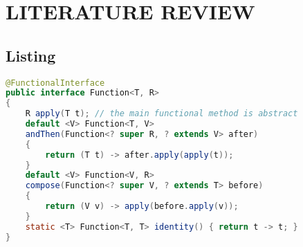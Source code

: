 
\chapter{LITERATURE REVIEW}

\section{Listing}

\begin{lstlisting}[language=Java]
@FunctionalInterface
public interface Function<T, R>
{
	R apply(T t); // the main functional method is abstract
	default <V> Function<T, V>
	andThen(Function<? super R, ? extends V> after)
	{
		return (T t) -> after.apply(apply(t));
	}
	default <V> Function<V, R>
	compose(Function<? super V, ? extends T> before)
	{
		return (V v) -> apply(before.apply(v));
	}
	static <T> Function<T, T> identity() { return t -> t; }
}
\end{lstlisting}
